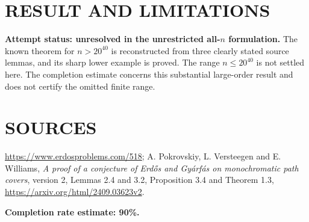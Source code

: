 \section{RESULT AND LIMITATIONS}
\textbf{Attempt status: unresolved in the unrestricted all-$n$ formulation.} The known theorem for $n>20^{40}$ is reconstructed from three clearly stated source lemmas, and its sharp lower example is proved. The range $n\leq20^{40}$ is not settled here. The completion estimate concerns this substantial large-order result and does not certify the omitted finite range.

\section{SOURCES}
\url{https://www.erdosproblems.com/518}; A. Pokrovskiy, L. Versteegen and E. Williams, \emph{A proof of a conjecture of Erd\H{o}s and Gy\'arf\'as on monochromatic path covers}, version 2, Lemmas 2.4 and 3.2, Proposition 3.4 and Theorem 1.3, \url{https://arxiv.org/html/2409.03623v2}.

\textbf{Completion rate estimate: 90\%.}
